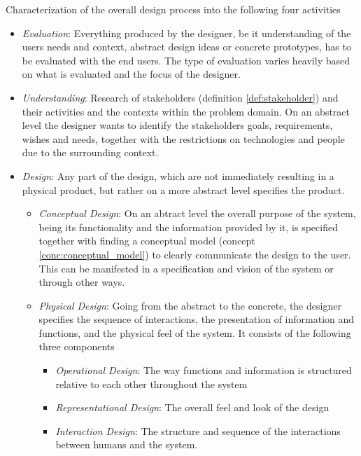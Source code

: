 \begin{framework}[Y-Model] \label{fw:y_model} 
  Characterization of the overall design process into the following four activities
  \begin{itemize}
    \item \emph{Evaluation}:
      Everything produced by the designer, be it understanding of the users needs and context, abstract design ideas or concrete prototypes, has to be evaluated with the end users. The type of evaluation varies heavily based on what is evaluated and the focus of the designer.
    \item \emph{Understanding}:
      Research of stakeholders (definition \ref{def:stakeholder}) and their activities and the contexts within the problem domain. On an abstract level the designer wants to identify the stakeholders goals, requirements, wishes and needs, together with the restrictions on technologies and people due to the surrounding context.
    \item \emph{Design}:
      Any part of the design, which are not immediately resulting in a physical product, but rather on a more abstract level specifies the product.
      \begin{itemize}
        \item \emph{Conceptual Design}:
          On an abtract level the overall purpose of the system, being its functionality and the information provided by it, is specified together with finding a conceptual model (concept \ref{conc:conceptual_model}) to clearly communicate the design to the user. This can be manifested in a specification and vision of the system or through other ways.
          
        \item \emph{Physical Design}:
          Going from the abstract to the concrete, the designer specifies the sequence of interactions, the presentation of information and functions, and the physical feel of the system. It consists of the following three components
          \begin{itemize}
            \item \emph{Operational Design}:
              The way functions and information is structured relative to each other throughout the system
              
            \item \emph{Representational Design}:
              The overall feel and look of the design
              
            \item \emph{Interaction Design}:
              The structure and sequence of the interactions between humans and the system.
              

\end{itemize}
\end{itemize}
\end{itemize}
\end{framework}
